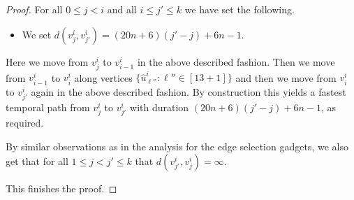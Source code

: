 \documentclass[a4paper,UKenglish,cleveref, autoref, thm-restate]{lipics-v2021}
\begin{document}
\begin{proof}
For all $0\le j<i$ and all $i\le j'\le k$ we have set the following.
\begin{itemize}
    \item We set $d(v^i_j,v^i_{j'})=(20n+6)(j'-j)+6n-1$.
\end{itemize}
Here we move from $v^i_j$ to $v^i_{i-1}$ in the above described fashion. Then we move from $v^i_{i-1}$ to $v^i_i$ along vertices $\{\hat{u}^i_{\ell''} :  \ell''\in[13+1]\}$ and then we move from $v^i_i$ to $v^i_{j'}$ again in the above described fashion. By construction this yields a fastest temporal path from $v^i_j$ to $v^i_{j'}$ with duration $(20n+6)(j'-j)+6n-1$, as required.

By similar observations as in the analysis for the edge selection gadgets, we also get that for all $1\le j<j'\le k$ that $d(v^i_{j'},v^i_j)=\infty$.

This finishes the proof.





\end{proof}
\end{document}
